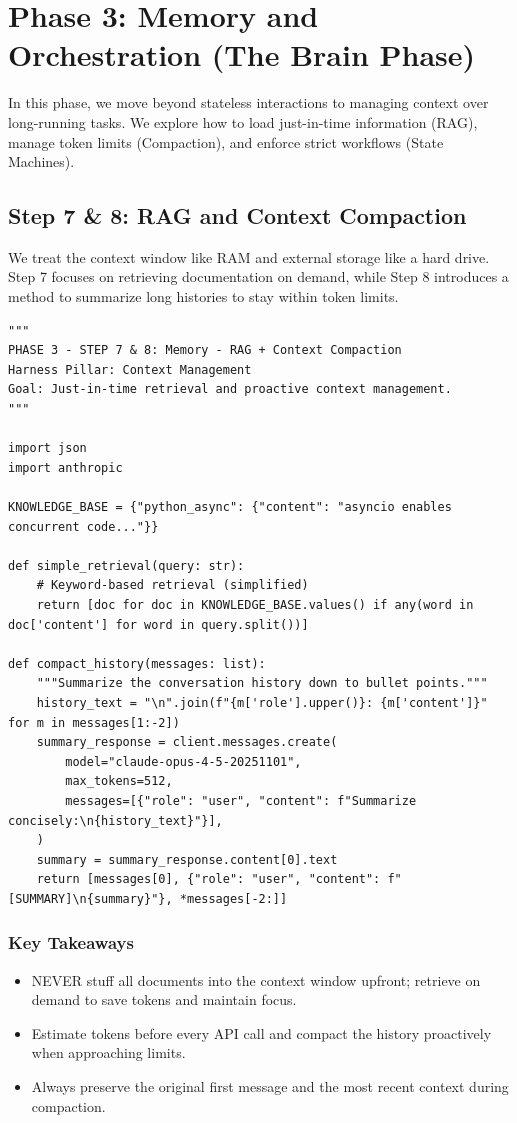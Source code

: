 \chapter{Phase 3: Memory and Orchestration (The Brain Phase)}

In this phase, we move beyond stateless interactions to managing context over long-running tasks. We explore how to load just-in-time information (RAG), manage token limits (Compaction), and enforce strict workflows (State Machines).

\section{Step 7 \& 8: RAG and Context Compaction}
We treat the context window like RAM and external storage like a hard drive. Step 7 focuses on retrieving documentation on demand, while Step 8 introduces a method to summarize long histories to stay within token limits.

\begin{lstlisting}[caption={step7\_8\_rag\_compaction.py}, label={lst:step7_8}]
"""
PHASE 3 - STEP 7 & 8: Memory - RAG + Context Compaction
Harness Pillar: Context Management
Goal: Just-in-time retrieval and proactive context management.
"""

import json
import anthropic

KNOWLEDGE_BASE = {"python_async": {"content": "asyncio enables concurrent code..."}}

def simple_retrieval(query: str):
    # Keyword-based retrieval (simplified)
    return [doc for doc in KNOWLEDGE_BASE.values() if any(word in doc['content'] for word in query.split())]

def compact_history(messages: list):
    """Summarize the conversation history down to bullet points."""
    history_text = "\n".join(f"{m['role'].upper()}: {m['content']}" for m in messages[1:-2])
    summary_response = client.messages.create(
        model="claude-opus-4-5-20251101",
        max_tokens=512,
        messages=[{"role": "user", "content": f"Summarize concisely:\n{history_text}"}],
    )
    summary = summary_response.content[0].text
    return [messages[0], {"role": "user", "content": f"[SUMMARY]\n{summary}"}, *messages[-2:]]
\end{lstlisting}

\subsection*{Key Takeaways}
\begin{itemize}
    \item NEVER stuff all documents into the context window upfront; retrieve on demand to save tokens and maintain focus.
    \item Estimate tokens before every API call and compact the history proactively when approaching limits.
    \item Always preserve the original first message and the most recent context during compaction.
\end{itemize}

